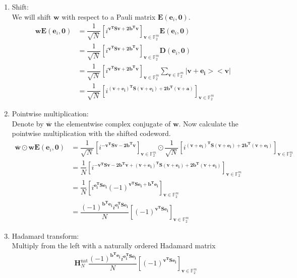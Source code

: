 \documentclass{article}
\begin{document}
\begin{enumerate}
	\item Shift: \\
		We will shift $\mathbf{w}$ with respect to a Pauli matrix $\mathbf{E}(\mathbf{e}_i, \mathbf{0})$.
		\begin{align*}
			\mathbf{wE}(\mathbf{e}_i,\mathbf{0}) &= \dfrac{1}{\sqrt{N}}\left[i^{\mathbf{v^TSv + 2b^Tv}}\right]_{\mathbf{v} \in \mathbb{F}_2^m} \mathbf{E}(\mathbf{e}_i, \mathbf{0}) \\
			&= \dfrac{1}{\sqrt{N}}\left[i^{\mathbf{v^TSv + 2b^Tv}}\right]_{\mathbf{v} \in \mathbb{F}_2^m} \mathbf{D}(\mathbf{e}_i, \mathbf{0}) \\
			&= \dfrac{1}{\sqrt{N}}\left[i^{\mathbf{v^TSv + 2b^Tv}}\right]_{\mathbf{v} \in \mathbb{F}_2^m} \sum_{\mathbf{v} \in \mathbb{F}_2^m}{|\mathbf{v+e_i}><\mathbf{v}|} \\
			&= \dfrac{1}{\sqrt{N}}\left[i^{\mathbf{(v+e_i)^TS(v+e_i) + 2b^T(v+a)}}\right]_{\mathbf{v} \in \mathbb{F}_2^m}
		\end{align*}
	\item Pointwise multiplication: \\
	Denote by $\overline{\mathbf{w}}$ the elementwise complex conjugate of $\mathbf{w}$.
	Now calculate the pointwise multiplication with the shifted codeword.
	\begin{align*}
		\overline{\mathbf{w}} \odot \mathbf{wE}(\mathbf{e}_i,\mathbf{0}) &=
		\dfrac{1}{\sqrt{N}}\left[i^{\mathbf{-v^TSv - 2b^Tv}}\right]_{\mathbf{v} \in \mathbb{F}_2^m} \odot \dfrac{1}{\sqrt{N}}\left[i^{\mathbf{(v+e_i)^TS(v+e_i) + 2b^T(v+e_i)}}\right]_{\mathbf{v} \in \mathbb{F}_2^m} \\
		&= \dfrac{1}{N} \left[i^{\mathbf{-v^TSv - 2b^Tv + (v+e_i)^TS(v+e_i) + 2b^T(v+e_i)}}\right]_{\mathbf{v} \in \mathbb{F}_2^m} \\
		&= \dfrac{1}{N}\left[i^{\mathbf{e_i^TSe_i}}(-1)^{\mathbf{v^TSe_i + b^Te_i}}\right]_{\mathbf{v} \in \mathbb{F}_2^m} \\
		&= \dfrac{(-1)^{\mathbf{b^Te_i}}i^{\mathbf{e_i^TSe_i}}}{N} \left[(-1)^{\mathbf{v^TSe_i}}\right]_{\mathbf{v} \in \mathbb{F}_2^m}
	\end{align*}
	\item Hadamard transform: \\
	Multiply from the left with a naturally ordered Hadamard matrix
	\begin{align*}
		&\mathbf{H}_N^{\text{nat}} \dfrac{(-1)^{\mathbf{b^Te_i}}i^{\mathbf{e_i^TSe_i}}}{N} \left[(-1)^{\mathbf{v^TSe_i}}\right]_{\mathbf{v} \in \mathbb{F}_2^m} \\

\end{align*}
\end{enumerate}
\end{document}

